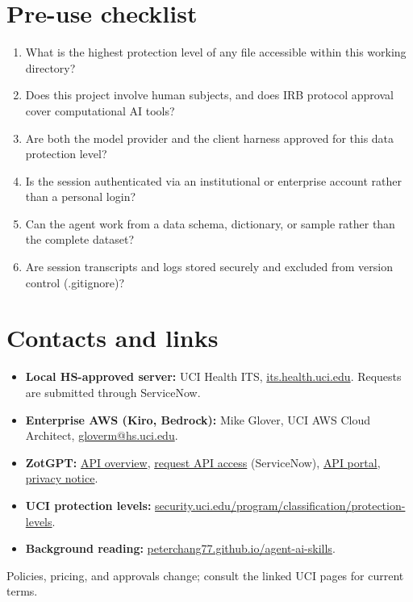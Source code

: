 \documentclass[10pt,letterpaper]{article}
\begin{document}
\section{Pre-use checklist}
\begin{enumerate}[label=$\square$,itemsep=1pt]
\item What is the highest protection level of any file accessible within this working directory?
\item Does this project involve human subjects, and does IRB protocol approval cover computational AI tools?
\item Are both the model provider and the client harness approved for this data protection level?
\item Is the session authenticated via an institutional or enterprise account rather than a personal login?
\item Can the agent work from a data schema, dictionary, or sample rather than the complete dataset?
\item Are session transcripts and logs stored securely and excluded from version control (.gitignore)?
\end{enumerate}

\section{Contacts and links}
\begin{itemize}
\item \textbf{Local HS-approved server:} UCI Health ITS, \href{https://its.health.uci.edu/}{its.health.uci.edu}. Requests are submitted through ServiceNow.
\item \textbf{Enterprise AWS (Kiro, Bedrock):} Mike Glover, UCI AWS Cloud Architect, \href{mailto:gloverm@hs.uci.edu}{gloverm@hs.uci.edu}.
\item \textbf{ZotGPT:} \href{https://zotgpt.uci.edu/services/api/}{API overview}, \href{https://uci.service-now.com/sp?id=kb_article_view&sysparm_article=KB0013367}{request API access} (ServiceNow),
\href{https://portal.azureapi.zotgpt.uci.edu}{API portal}, \href{https://zotgpt.uci.edu/privacy}{privacy notice}.
\item \textbf{UCI protection levels:} \href{https://www.security.uci.edu/program/classification/protection-levels/}{security.uci.edu/program/classification/protection-levels}.
\item \textbf{Background reading:} \href{https://peterchang77.github.io/agent-ai-skills/}{peterchang77.github.io/agent-ai-skills}.
\end{itemize}

\vspace{-1pt}
{\footnotesize Policies, pricing, and approvals change; consult the linked UCI pages for current terms.}
\end{document}
